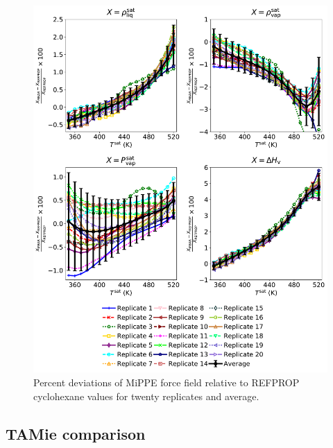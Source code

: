 \documentclass[journal=jctc,manuscript=article]{achemso}
\begin{document}
	\begin{figure}[H]
		\centering
		\includegraphics[width=5.8in]{CYC6_deviations_20replicates.pdf}
		\caption{Percent deviations of MiPPE force field relative to REFPROP cyclohexane values for twenty replicates and average.}
		\label{SI fig: VLE cyclohexane replicates}
	\end{figure}

\newpage
\clearpage

\subsection{TAMie comparison} \label{SI sec: TAMie comparison}
\end{document}
